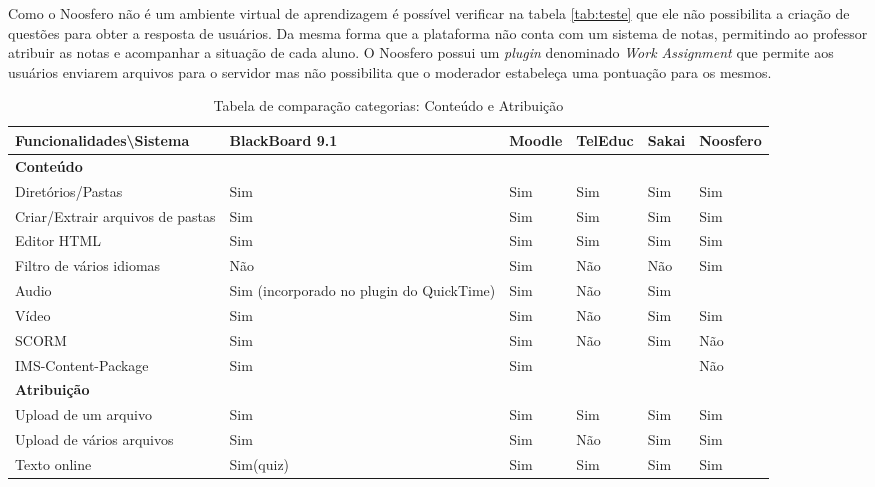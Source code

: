 Como o Noosfero não é um ambiente virtual de aprendizagem é possível verificar na tabela \ref{tab:teste} que ele não possibilita a criação de questões para obter a resposta de usuários. Da mesma forma que a plataforma não conta com um sistema de notas, permitindo ao professor atribuir as notas e acompanhar a situação de cada aluno. O Noosfero possui um \textit{plugin} denominado \textit{Work Assignment} que permite aos usuários enviarem arquivos para o servidor mas não possibilita que o moderador estabeleça uma pontuação para os mesmos.

\begin{landscape}
\begin{table}[H]
\begin{center}
\begin{tabular}{|@{}p{5.5cm}|p{3.5cm}|p{3.5cm}|p{3.5cm}|p{3.5cm}|p{3.5cm}@{}|}
\hline
\textbf{Funcionalidades\textbackslash Sistema} & \textbf{BlackBoard 9.1} & \textbf{Moodle} & \textbf{TelEduc} & \textbf{Sakai} & \textbf{Noosfero}\\ \hline
\textbf{Conteúdo} &  &  &  &  &  \\
Diretórios/Pastas & Sim & Sim & Sim & Sim & Sim \\
Criar/Extrair arquivos de pastas & Sim & Sim & Sim & Sim & Sim \\
Editor HTML & Sim & Sim & Sim & Sim & Sim \\
Filtro de vários idiomas & Não & Sim & Não & Não & Sim \\
Audio & Sim {\tiny (incorporado no plugin do QuickTime)} & Sim & Não & Sim &  \\
Vídeo & Sim & Sim & Não & Sim & Sim \\
SCORM & Sim & Sim & Não & Sim & Não \\
IMS-Content-Package & Sim & Sim &  &  & Não \\
\textbf{Atribuição} &  &  &  &  &  \\
Upload de um arquivo & Sim & Sim & Sim & Sim & Sim \\
Upload de vários arquivos & Sim & Sim & Não & Sim & Sim \\
Texto online & Sim(quiz) & Sim & Sim & Sim & Sim \\ \hline
\end{tabular}
\caption{Tabela de comparação categorias: Conteúdo e Atribuição}
\label{tab:conteudo-atribuicao}
\end{center}
\end{table}


\end{landscape}
